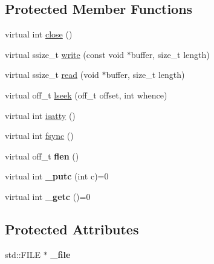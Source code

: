 \subsection*{Protected Member Functions}
\begin{DoxyCompactItemize}
\item 
virtual int \hyperlink{classmbed_1_1Stream_af6289a4ebd6e3e39e713434ee0b5ae1a}{close} ()
\item 
virtual ssize\+\_\+t \hyperlink{classmbed_1_1Stream_a1da24e639462b324eaf9a7fa4ebbe9c5}{write} (const void $\ast$buffer, size\+\_\+t length)
\item 
virtual ssize\+\_\+t \hyperlink{classmbed_1_1Stream_a23d92c19945db06a616481bfdad5b41b}{read} (void $\ast$buffer, size\+\_\+t length)
\item 
virtual off\+\_\+t \hyperlink{classmbed_1_1Stream_ab5d71558dfc46985f9b3ca66099f845e}{lseek} (off\+\_\+t offset, int whence)
\item 
virtual int \hyperlink{classmbed_1_1Stream_a1ad0b3f218c68d8f7aeb24f4878b6347}{isatty} ()
\item 
virtual int \hyperlink{classmbed_1_1Stream_a9964211822494845a9ef8fe514aa5bbd}{fsync} ()
\item 
virtual off\+\_\+t {\bfseries flen} ()\hypertarget{classmbed_1_1Stream_a33cb53db6b3d6182d2acdd6d3c1a072b}{}\label{classmbed_1_1Stream_a33cb53db6b3d6182d2acdd6d3c1a072b}

\item 
virtual int {\bfseries \+\_\+putc} (int c)=0\hypertarget{classmbed_1_1Stream_a28fbd18ed2335b37b896ce73f3cf9941}{}\label{classmbed_1_1Stream_a28fbd18ed2335b37b896ce73f3cf9941}

\item 
virtual int {\bfseries \+\_\+getc} ()=0\hypertarget{classmbed_1_1Stream_a262e3791dc36a057eb1a6a7461bacc8f}{}\label{classmbed_1_1Stream_a262e3791dc36a057eb1a6a7461bacc8f}

\end{DoxyCompactItemize}
\subsection*{Protected Attributes}
\begin{DoxyCompactItemize}
\item 
std\+::\+F\+I\+LE $\ast$ {\bfseries \+\_\+file}\hypertarget{classmbed_1_1Stream_ae4ee478b704c5cc1e55fed9b17398875}{}\label{classmbed_1_1Stream_ae4ee478b704c5cc1e55fed9b17398875}

\end{DoxyCompactItemize}
